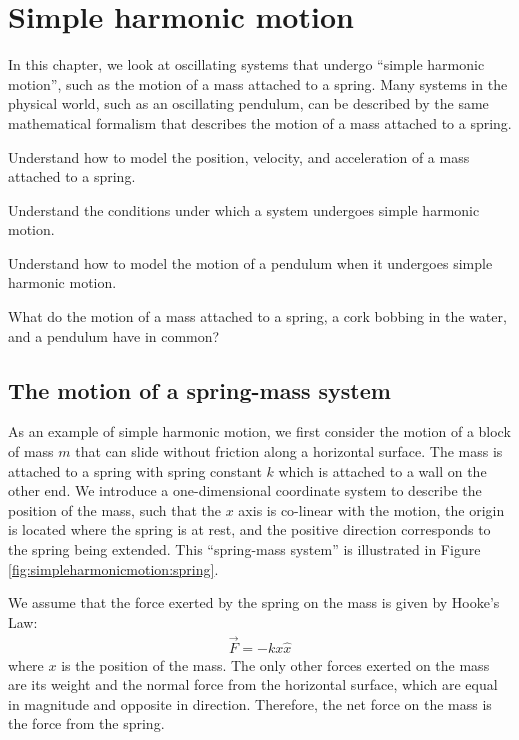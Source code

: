 
\chapter{Simple harmonic motion}
\label{chapter:simpleharmonicmotion}
In this chapter, we look at oscillating systems that undergo ``simple harmonic motion'', such as the motion of a mass attached to a spring. Many systems in the physical world, such as an oscillating pendulum, can be described by the same mathematical formalism that describes the motion of a mass attached to a spring. 

\begin{learningObjectives}{
 \item Understand how to model the position, velocity, and acceleration of a mass attached to a spring.
 \item Understand the conditions under which a system undergoes simple harmonic motion.
 \item Understand how to model the motion of a pendulum when it undergoes simple harmonic motion.
 }
\end{learningObjectives}

\begin{opening}
What do the motion of a mass attached to a spring, a cork bobbing in the water, and a pendulum have in common?
\end{opening}

\section{The motion of a spring-mass system}
As an example of simple harmonic motion, we first consider the motion of a block of mass $m$ that can slide without friction along a horizontal surface. The mass is attached to a spring with spring constant $k$ which is attached to a wall on the other end. We introduce a one-dimensional coordinate system to describe the position of the mass, such that the $x$ axis is co-linear with the motion, the origin is located where the spring is at rest, and the positive direction corresponds to the spring being extended. This ``spring-mass system'' is illustrated in Figure \ref{fig:simpleharmonicmotion:spring}.

We assume that the force exerted by the spring on the mass is given by Hooke's Law:
\begin{align*}
\vec F = -kx \hat x
\end{align*}
where $x$ is the position of the mass. The only other forces exerted on the mass are its weight and the normal force from the horizontal surface, which are equal in magnitude and opposite in direction. Therefore, the net force on the mass is the force from the spring. 

